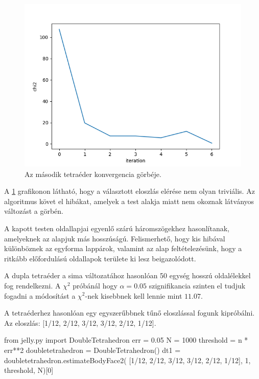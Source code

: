 \begin{figure}[h!]
	\centering
	\includegraphics[scale=0.7]{images/tetrahedron_02.png}
	\caption{Az második tetraéder konvergencia görbéje.}
	\label{fig:tetra02}
\end{figure}

A \ref{fig:tetra02} grafikonon látható, hogy a választott eloszlás elérése nem olyan triviális.
Az algoritmus követ el hibákat, amelyek a test alakja miatt nem okoznak látványos változást a görbén.

A kapott testen oldallapjai egyenlő szárú háromszögekhez hasonlítanak, amelyeknek az alapjuk más hosszúságú.
Felismerhető, hogy kis hibával különböznek az egyforma lappárok, valamint az alap feltételezésünk, hogy a ritkább előfordulású oldallapok területe ki lesz beigazolódott.

\newpage


A dupla tetraéder a sima változatához hasonlóan 50 egység hosszú oldalélekkel fog rendelkezni.
A $\chi^2$ próbánál hogy $\alpha = 0.05$ szignifikancia szinten el tudjuk fogadni a módosítást a $\chi^2$-nek kisebbnek kell lennie mint $11.07$.


A tetraéderhez hasonlóan egy egyszerűbbnek tűnő eloszlással fogunk kipróbálni.
Az eloszlás: [1/12, 2/12, 3/12, 3/12, 2/12, 1/12].

\begin{python}
from jelly.py import DoubleTetrahedron
err = 0.05
N = 1000
threshold = n * err**2
doubletetrahedron = DoubleTetrahedron()
dt1 = doubletetrahedron.estimateBodyFace2(
      [1/12, 2/12, 3/12, 3/12, 2/12, 1/12],
      1, threshold, N)[0]
\end{python}

